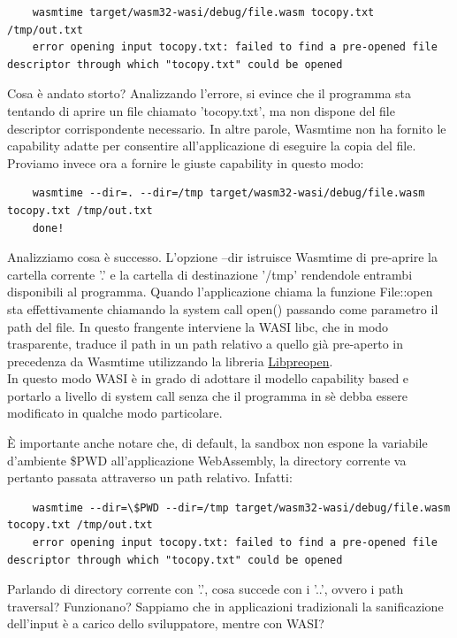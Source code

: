 \begin{lstlisting}
    wasmtime target/wasm32-wasi/debug/file.wasm tocopy.txt /tmp/out.txt
    error opening input tocopy.txt: failed to find a pre-opened file descriptor through which "tocopy.txt" could be opened
\end{lstlisting}
Cosa è andato storto? Analizzando l'errore, si evince che il programma sta tentando di aprire un file chiamato
'tocopy.txt', ma non dispone del file descriptor corrispondente necessario. In altre parole, Wasmtime non ha fornito le
capability adatte per consentire all'applicazione di eseguire la copia del file. \\
Proviamo invece ora a fornire le giuste capability in questo modo:
\begin{lstlisting}
    wasmtime --dir=. --dir=/tmp target/wasm32-wasi/debug/file.wasm tocopy.txt /tmp/out.txt
    done!
\end{lstlisting}
Analizziamo cosa è successo. L'opzione --dir istruisce Wasmtime di pre-aprire la cartella corrente '.' e la cartella di
destinazione '/tmp' rendendole entrambi disponibili al programma. Quando l'applicazione chiama la funzione File::open
sta effettivamente chiamando la system call open() passando come parametro il path del file. In questo frangente
interviene la WASI libc, che in modo trasparente, traduce il path in un path relativo a quello già pre-aperto in
precedenza da Wasmtime utilizzando la libreria \hyperref[sec:libpreopen]{Libpreopen}. \\In questo modo WASI è in grado
di adottare il modello capability based e portarlo a livello di system call senza che il programma in sè debba essere
modificato in qualche modo particolare.

È importante anche notare che, di default, la sandbox non espone la variabile d'ambiente \$PWD all'applicazione
WebAssembly, la directory corrente va pertanto passata attraverso un path relativo. Infatti:
\begin{lstlisting}
    wasmtime --dir=\$PWD --dir=/tmp target/wasm32-wasi/debug/file.wasm tocopy.txt /tmp/out.txt
    error opening input tocopy.txt: failed to find a pre-opened file descriptor through which "tocopy.txt" could be opened
\end{lstlisting}

Parlando di directory corrente con '.', cosa succede con i '..', ovvero i path traversal? Funzionano? Sappiamo che in
applicazioni tradizionali la sanificazione dell'input è a carico dello sviluppatore, mentre con WASI?

